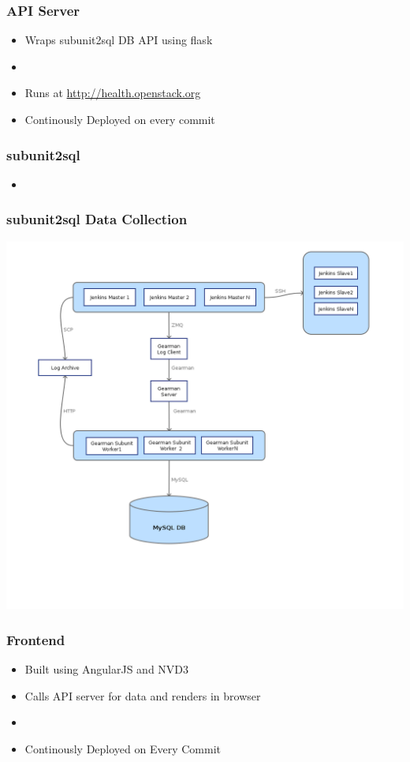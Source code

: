 \documentclass[aspectratio=169,11pt,hyperref={colorlinks=true}]{beamer}
\begin{document}
\begin{frame}
    \frametitle{API Server}
    \begin{itemize}
        \item Wraps subunit2sql DB API using flask
        \item 
        \item Runs at \href{http://health.openstack.org}{http://health.openstack.org}
        \item Continously Deployed on every commit
    \end{itemize}
\end{frame}

\begin{frame}
    \frametitle{subunit2sql}
    \begin{itemize}
        \item 
    \end{itemize}
\end{frame}

\begin{frame}
    \frametitle{subunit2sql Data Collection}
    \begin{center}
        \includegraphics[width=.7\textwidth]{subunit2sql-collection.png}
    \end{center}
\end{frame}

\begin{frame}
    \frametitle{Frontend}
    \begin{itemize}
        \item Built using AngularJS and NVD3
        \item Calls API server for data and renders in browser
        \item
        \item Continously Deployed on Every Commit
    \end{itemize}
\end{frame}
\end{document}
